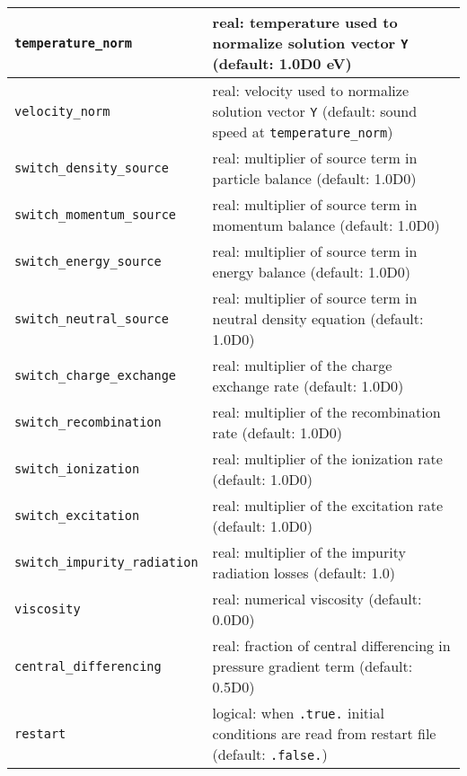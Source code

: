 \documentclass[amsmath,amssymb,a4]{revtex4-2}
\begin{document}
\begin{table}[h]
\begin{center}
\begin{tabular}{|| l  | l ||}
	{\tt temperature\_norm}      & real: temperature used to normalize solution vector {\tt Y} (default: 1.0D0 eV) \\ \hline
	{\tt velocity\_norm}         & real: velocity used to normalize solution vector {\tt Y} (default: sound speed at {\tt temperature\_norm}) \\ \hline
	{\tt switch\_density\_source} & real: multiplier of source term in particle balance (default: 1.0D0) \\ \hline
	{\tt switch\_momentum\_source}& real: multiplier of source term in momentum balance (default: 1.0D0) \\ \hline
	{\tt switch\_energy\_source}  & real: multiplier of source term in energy balance (default: 1.0D0) \\ \hline
	{\tt switch\_neutral\_source} & real: multiplier of source term in neutral density equation (default: 1.0D0) \\ \hline
	{\tt switch\_charge\_exchange}& real: multiplier of the charge exchange rate (default: 1.0D0) \\ \hline
	{\tt switch\_recombination}  & real: multiplier of the recombination rate (default: 1.0D0) \\ \hline
	{\tt switch\_ionization}     & real: multiplier of the ionization rate (default: 1.0D0) \\ \hline
	{\tt switch\_excitation}     & real: multiplier of the excitation rate (default: 1.0D0) \\ \hline
	{\tt switch\_impurity\_radiation}& real: multiplier of the impurity radiation losses (default: 1.0) \\ \hline
	{\tt viscosity}              & real: numerical viscosity (default: 0.0D0)  \\ \hline
	{\tt central\_differencing}   & real: fraction of central differencing in pressure gradient term (default: 0.5D0) \\ \hline
	{\tt restart}                & logical: when {\tt .true.} initial conditions are read from restart file (default: {\tt .false.}) \\ \hline
    \hline
  \end{tabular}
\end{center}
\end{table}
\end{document}
